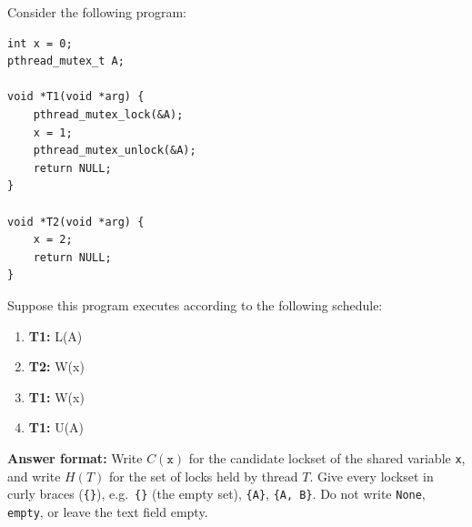 \documentclass[addpoints]{exam}
\newcommand{\nonAnswerNewPage}{\ifprintanswers \vfill \else \newpage \fi}
\newcommand{\LS}[1]{\texttt{\{#1\}}}
\begin{document}
\begin{questions}
\nonAnswerNewPage

\question Consider the following program:

\begin{verbatim}
int x = 0;
pthread_mutex_t A;

void *T1(void *arg) {
    pthread_mutex_lock(&A);
    x = 1;
    pthread_mutex_unlock(&A);
    return NULL;
}

void *T2(void *arg) {
    x = 2;
    return NULL;
}
\end{verbatim}

  Suppose this program executes according to the following schedule:
  \begin{enumerate}
  \item \textbf{T1:} L(A)
  \item \textbf{T2:} W(x)
  \item \textbf{T1:} W(x)
  \item \textbf{T1:} U(A)
  \end{enumerate}

  \textbf{Answer format:} Write $C(\texttt{x})$ for the candidate
  lockset of the shared variable \texttt{x}, and write $H(T)$ for the
  set of locks held by thread $T$. Give every lockset in curly braces
  (\texttt{\{\}}), e.g.\ \LS{} (the empty set), \LS{A}, \LS{A, B}. Do
  not write \texttt{None}, \texttt{empty}, or leave the text field
  empty.

\end{questions}
\end{document}
